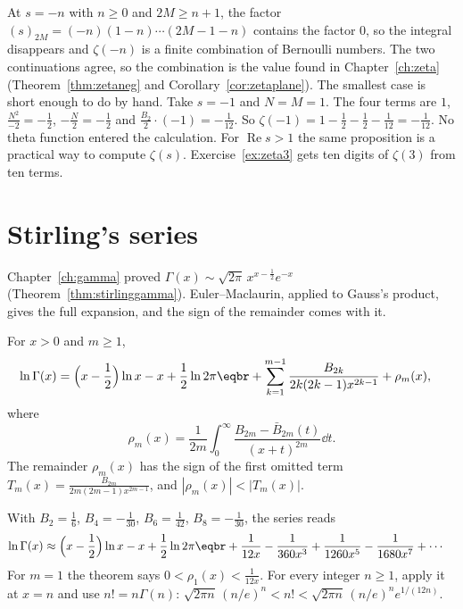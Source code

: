 At $s=-n$ with $n\ge0$ and $2M\ge n+1$, the factor $(s)_{2M}=(-n)(1-n)\cdots(2M-1-n)$ contains the factor $0$, so the integral disappears and $\zeta(-n)$ is a finite combination of Bernoulli numbers. The two continuations agree, so the combination is the value found in Chapter~\ref{ch:zeta} (Theorem~\ref{thm:zetaneg} and Corollary~\ref{cor:zetaplane}). The smallest case is short enough to do by hand. Take $s=-1$ and $N=M=1$. The four terms are $1$, $\frac{N^2}{-2}=-\frac12$, $-\frac N2=-\frac12$ and $\frac{B_2}{2}\cdot(-1)=-\frac1{12}$. So $\zeta(-1)=1-\frac12-\frac12-\frac1{12}=-\frac1{12}$. No theta function entered the calculation. For $\operatorname{Re}s>1$ the same proposition is a practical way to compute $\zeta(s)$. Exercise~\ref{ex:zeta3} gets ten digits of $\zeta(3)$ from ten terms.

\section{Stirling's series}

Chapter~\ref{ch:gamma} proved $\Gamma(x)\sim\sqrt{2\pi}\,x^{x-\frac12}e^{-x}$ (Theorem~\ref{thm:stirlinggamma}). Euler--Maclaurin, applied to Gauss's product, gives the full expansion, and the sign of the remainder comes with it.

\begin{theorem}\label{thm:stirlingseries}
For $x>0$ and $m\ge1$,
\[
\begin{aligned}\ln\Gamma(x)&=\Bigl(x-\frac12\Bigr)\ln x-x+\frac12\ln2\pi\eqbr+\sum_{k=1}^{m-1}\frac{B_{2k}}{2k(2k-1)x^{2k-1}}+\rho_m(x),\end{aligned}
\]
where
\[
\rho_m(x)=\frac1{2m}\int_0^\infty\frac{B_{2m}-\bar B_{2m}(t)}{(x+t)^{2m}}\dd t.
\]
The remainder $\rho_m(x)$ has the sign of the first omitted term $T_m(x)=\frac{B_{2m}}{2m(2m-1)x^{2m-1}}$, and $|\rho_m(x)|<|T_m(x)|$.
\end{theorem}

With $B_2=\frac16$, $B_4=-\frac1{30}$, $B_6=\frac1{42}$, $B_8=-\frac1{30}$, the series reads
\[
\begin{aligned}\ln\Gamma(x)&\approx\Bigl(x-\frac12\Bigr)\ln x-x+\frac12\ln2\pi\eqbr+\frac1{12x}-\frac1{360x^3}+\frac1{1260x^5}-\frac1{1680x^7}+\cdots\end{aligned}
\]
For $m=1$ the theorem says $0<\rho_1(x)<\frac1{12x}$. For every integer $n\ge1$, apply it at $x=n$ and use $n!=n\Gamma(n)$:
$\sqrt{2\pi n}\,(n/e)^n<n!<\sqrt{2\pi n}\,(n/e)^ne^{1/(12n)}$.

